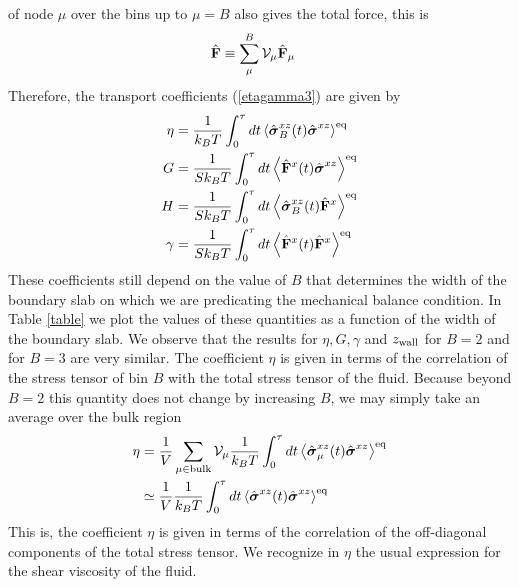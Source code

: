 \documentclass[b5paper,openright,10pt]{book}
\begin{document}
of node $\mu$ over the bins up  to $\mu=B$ also gives the total force,
this is
\begin{align}
  \hat{\bf F}&\equiv \sum_\mu^B{\cal V}_\mu\hat{\bf F}_\mu
\end{align}
Therefore, the transport coefficients (\ref{etagamma3}) are given by
\begin{align}
\eta&= \frac{1}{k_BT}\int_0^{\tau} dt
\left\langle  \hat{\boldsymbol{\sigma}}^{xz}_{B}(t) \hat{\boldsymbol{\sigma}}^{xz}\right\rangle^{\rm eq}
\nonumber\\
G &=   \frac{1}{Sk_BT}\int_0^{\tau} dt
\left\langle  \hat{\bf F}^{x}(t) \hat{\boldsymbol{\sigma}}^{xz}\right\rangle^{\rm eq}
\nonumber\\
H &=   \frac{1}{Sk_BT}\int_0^{\tau} dt
\left\langle  \hat{\boldsymbol{\sigma}}^{xz}_{B}(t) \hat{\bf F}^{x}\right\rangle^{\rm eq}
\nonumber\\
\gamma&= 
\frac{1}{Sk_BT}\int_0^{\tau} dt
\left\langle  \hat{\bf F}^{x}(t)\hat{\bf F}^{x}\right\rangle^{\rm eq}
\label{FinMic}
\end{align}
These coefficients  still depend on  the value of $B$  that determines
the  width of  the  boundary  slab on  which  we  are predicating  the
mechanical balance condition.  In Table \ref{table} we plot the values
of these quantities as a function  of the width of the boundary slab.
We observe that the results for $\eta,G,\gamma$ and $z_{\rm wall}$ for
$B=2$ and for $B=3$ are very similar.  The coefficient $\eta$ is given
in terms of the  correlation of the stress tensor of  bin $B$ with the
total stress tensor of the  fluid.  Because beyond $B=2$ this quantity
does not change by increasing $B$,  we may simply take an average over
the bulk region
\begin{align}
  \eta&= \frac{1}{V}\sum_{\mu\in{\rm bulk}}{\cal V}_\mu \frac{1}{k_BT}\int_0^{\tau} dt
\left\langle  \hat{\boldsymbol{\sigma}}^{xz}_{\mu}(t) \hat{\boldsymbol{\sigma}}^{xz}\right\rangle^{\rm eq}
\nonumber\\
&\simeq \frac{1}{V}\frac{1}{k_BT}\int_0^{\tau} dt
\left\langle  \hat{\boldsymbol{\sigma}}^{xz}(t) \hat{\boldsymbol{\sigma}}^{xz}\right\rangle^{\rm eq}
\end{align}
This is, the  coefficient $\eta$ is given in terms  of the correlation
of  the  off-diagonal  components  of the  total  stress  tensor.   We
recognize in  $\eta$ the usual  expression for the shear  viscosity of
the fluid.  
\end{document}
